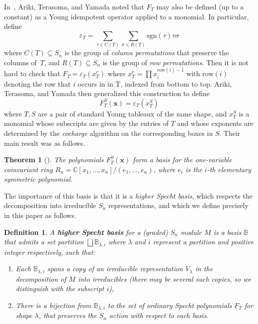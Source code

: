 \documentclass[11pt]{article}
\newtheorem{thm}[theo]{Theorem}
\newtheorem{definition}[theo]{Definition}
\theoremstyle{definition}
\numberwithin{equation}{section}
\newcommand{\sgn}{\mathrm{sgn}}
\begin{document}
In~\cite{ATY}, Ariki, Terasoma, and Yamada noted that $F_T$ may also be defined (up to a constant) as a Young idempotent operator applied to a monomial.  In particular, define $$\varepsilon_T=\sum_{\tau \in C(T)}\sum_{\sigma \in R(T)}\sgn(\tau) \tau \sigma$$ where $C(T)\subseteq S_n$ is the group of \textit{column permutations} that preserve the columns of~$T$, and $R(T)\subseteq S_n$ is the group of \textit{row permutations}. 
Then it is not hard to check that $F_T=\varepsilon_T(x_T^r)$ where $x_T^r=\prod x_i^{\mathrm{row}(i)-1}$ with $\mathrm{row}(i)$ denoting the row that $i$ occurs in in T, indexed from bottom to top.  Ariki, Terasoma, and Yamada then generalized this construction to define 
\begin{equation}\label{eq:ATY} F_T^S(\mathbf{x}) = \varepsilon_T(x_T^S)\end{equation} 
where $T,S$ are a pair of standard Young tableaux of the same shape, and $x_T^S$ is a monomial whose subscripts are given by the entries of $T$ and whose exponents are determined by the \textit{cocharge} algorithm on the corresponding boxes in $S$.  Their main result was as follows.

\begin{thm}[\cite{ATY}]
	The polynomials $F_T^S(\mathbf{x})$ form a basis for the one-variable coinvariant ring $R_n=\mathbb{C}[x_1,\ldots,x_n]/(e_1,\ldots,e_n)$, where $e_i$ is the $i$-th elementary symmetric polynomial.
\end{thm}

The importance of this basis is that it is a \textit{higher Specht basis}, which respects the decomposition into irreducible $S_n$ representations, and which we define precisely in this paper as follows.

\begin{definition}
	A \textbf{higher Specht basis} for a (graded) $S_n$ module $M$ is a basis $\mathbb{B}$ that admits a set partition $\bigsqcup \mathbb{B}_{\lambda,i}$ where $\lambda$ and $i$ represent a partition and positive integer respectively, such that:
	\begin{enumerate}
		\item Each $\mathbb{B}_{\lambda,i}$ spans a copy of an irreducible representation $V_\lambda$ in the decomposition of $M$ into irreducibles (there may be several such copies, so we distinguish with the subscript $i$),
		\item There is a bijection from $\mathbb{B}_{\lambda,i}$ to the set of ordinary Specht polynomials $F_T$ for shape $\lambda$, that preserves the $S_n$ action with respect to each basis.
	\end{enumerate} 
\end{definition}
\end{document}
